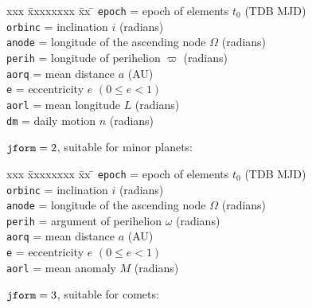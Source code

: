 \documentclass[11pt,fleqn,twoside]{article}
\renewcommand{\_}{{\tt\char'137}}     %
\begin{document}
{\begin{enumerate}
        \begin{tabbing}
        xxx \= xxxxxxxx \= xx \= \kill
        \> {\tt epoch}  \> = \> epoch of elements $t_0$ (TDB MJD) \\
        \> {\tt orbinc} \> = \> inclination $i$ (radians) \\
        \> {\tt anode}  \> = \> longitude of the
                                ascending node $\Omega$ (radians) \\
        \> {\tt perih}  \> = \> longitude of perihelion
                                $\varpi$ (radians) \\
        \> {\tt aorq}   \> = \> mean distance $a$ (AU) \\
        \> {\tt e}      \> = \> eccentricity $e$ $( 0 \leq e < 1 )$ \\
        \> {\tt aorl}   \> = \> mean longitude $L$ (radians) \\
        \> {\tt dm}     \> = \> daily motion $n$ (radians)
        \end{tabbing}
 
        ${\tt jform}=2$, suitable for minor planets:
 
        \begin{tabbing}
        xxx \= xxxxxxxx \= xx \= \kill
        \> {\tt epoch}  \> = \> epoch of elements $t_0$ (TDB MJD) \\
        \> {\tt orbinc} \> = \> inclination $i$ (radians) \\
        \> {\tt anode}  \> = \> longitude of the ascending node
                                $\Omega$ (radians) \\
        \> {\tt perih}  \> = \> argument of perihelion
                                $\omega$ (radians) \\
        \> {\tt aorq}   \> = \> mean distance $a$ (AU) \\
        \> {\tt e}      \> = \> eccentricity $e$ $( 0 \leq e < 1 )$ \\
        \> {\tt aorl}   \> = \> mean anomaly $M$ (radians)
        \end{tabbing}
 
        ${\tt jform}=3$, suitable for comets:
 

\end{enumerate}}
\end{document}
